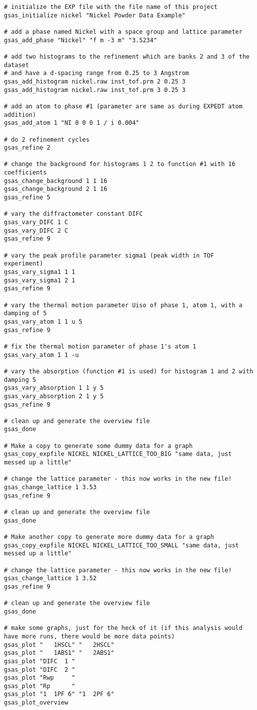 \begin{verbatim} 
# initialize the EXP file with the file name of this project
gsas_initialize nickel "Nickel Powder Data Example"

# add a phase named Nickel with a space group and lattice parameter
gsas_add_phase "Nickel" "f m -3 m" "3.5234"

# add two histograms to the refinement which are banks 2 and 3 of the dataset
# and have a d-spacing range from 0.25 to 3 Angstrom
gsas_add_histogram nickel.raw inst_tof.prm 2 0.25 3
gsas_add_histogram nickel.raw inst_tof.prm 3 0.25 3

# add an atom to phase #1 (parameter are same as during EXPEDT atom addition)
gsas_add_atom 1 "NI 0 0 0 1 / i 0.004"

# do 2 refinement cycles
gsas_refine 2

# change the background for histograms 1 2 to function #1 with 16 coefficients
gsas_change_background 1 1 16
gsas_change_background 2 1 16
gsas_refine 5

# vary the diffractometer constant DIFC
gsas_vary_DIFC 1 C
gsas_vary_DIFC 2 C
gsas_refine 9

# vary the peak profile parameter sigma1 (peak width in TOF experiment)
gsas_vary_sigma1 1 1
gsas_vary_sigma1 2 1
gsas_refine 9

# vary the thermal motion parameter Uiso of phase 1, atom 1, with a damping of 5
gsas_vary_atom 1 1 u 5
gsas_refine 9

# fix the thermal motion parameter of phase 1's atom 1
gsas_vary_atom 1 1 -u

# vary the absorption (function #1 is used) for histogram 1 and 2 with damping 5
gsas_vary_absorption 1 1 y 5
gsas_vary_absorption 2 1 y 5
gsas_refine 9

# clean up and generate the overview file
gsas_done

# Make a copy to generate some dummy data for a graph
gsas_copy_expfile NICKEL NICKEL_LATTICE_TOO_BIG "same data, just messed up a little"

# change the lattice parameter - this now works in the new file!
gsas_change_lattice 1 3.53
gsas_refine 9

# clean up and generate the overview file
gsas_done

# Make another copy to generate more dummy data for a graph
gsas_copy_expfile NICKEL NICKEL_LATTICE_TOO_SMALL "same data, just messed up a little"

# change the lattice parameter - this now works in the new file!
gsas_change_lattice 1 3.52
gsas_refine 9

# clean up and generate the overview file
gsas_done

# make some graphs, just for the heck of it (if this analysis would have more runs, there would be more data points)
gsas_plot "   1HSCL" "   2HSCL"
gsas_plot "   1ABS1" "   2ABS1"
gsas_plot "DIFC  1 " 
gsas_plot "DIFC  2 "
gsas_plot "Rwp     "
gsas_plot "Rp      "
gsas_plot "1  1PF 6" "1  2PF 6"
gsas_plot_overview
\end{verbatim}

